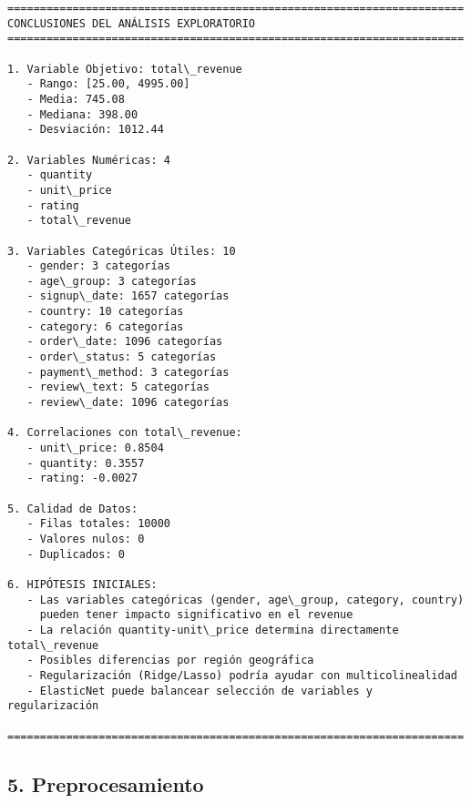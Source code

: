 \documentclass[11pt]{article}
\begin{document}
    \begin{Verbatim}[commandchars=\\\{\}]
======================================================================
CONCLUSIONES DEL ANÁLISIS EXPLORATORIO
======================================================================

1. Variable Objetivo: total\_revenue
   - Rango: [25.00, 4995.00]
   - Media: 745.08
   - Mediana: 398.00
   - Desviación: 1012.44

2. Variables Numéricas: 4
   - quantity
   - unit\_price
   - rating
   - total\_revenue

3. Variables Categóricas Útiles: 10
   - gender: 3 categorías
   - age\_group: 3 categorías
   - signup\_date: 1657 categorías
   - country: 10 categorías
   - category: 6 categorías
   - order\_date: 1096 categorías
   - order\_status: 5 categorías
   - payment\_method: 3 categorías
   - review\_text: 5 categorías
   - review\_date: 1096 categorías

4. Correlaciones con total\_revenue:
   - unit\_price: 0.8504
   - quantity: 0.3557
   - rating: -0.0027

5. Calidad de Datos:
   - Filas totales: 10000
   - Valores nulos: 0
   - Duplicados: 0

6. HIPÓTESIS INICIALES:
   - Las variables categóricas (gender, age\_group, category, country)
     pueden tener impacto significativo en el revenue
   - La relación quantity-unit\_price determina directamente total\_revenue
   - Posibles diferencias por región geográfica
   - Regularización (Ridge/Lasso) podría ayudar con multicolinealidad
   - ElasticNet puede balancear selección de variables y regularización

======================================================================
    \end{Verbatim}

    \subsection{5. Preprocesamiento}\label{preprocesamiento}
\end{document}
